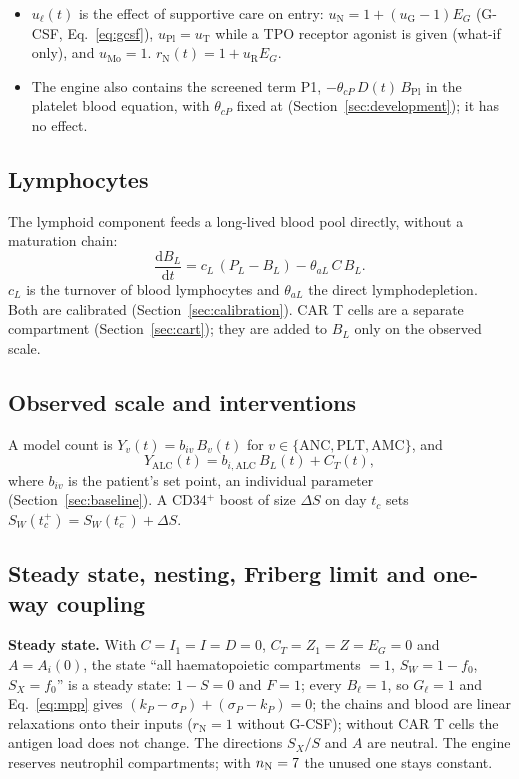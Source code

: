 \documentclass[11pt]{article}
\newcommand{\dd}{\mathrm{d}}
\begin{document}
\begin{itemize}
\item $u_\ell(t)$ is the effect of supportive care on entry: $u_{\mathrm{N}}=1+(u_{\mathrm{G}}-1)E_G$ (G-CSF, Eq.~\ref{eq:gcsf}), $u_{\mathrm{Pl}}=u_{\mathrm{T}}$ while a TPO receptor agonist is given (what-if only), and $u_{\mathrm{Mo}}=1$. $r_{\mathrm{N}}(t)=1+u_{\mathrm{R}}E_G$.
\item The engine also contains the screened term P1, $-\theta_{cP}\,D(t)\,B_{\mathrm{Pl}}$ in the platelet blood equation, with $\theta_{cP}$ fixed at \valThcp{} (Section~\ref{sec:development}); it has no effect.
\end{itemize}

\subsection{Lymphocytes}
The lymphoid component feeds a long-lived blood pool directly, without a maturation chain:
\begin{equation}
\frac{\dd B_L}{\dd t} = c_L\,(P_L-B_L) - \theta_{aL}\,C\,B_L. \label{eq:bl}
\end{equation}
$c_L$ is the turnover of blood lymphocytes and $\theta_{aL}$ the direct lymphodepletion. Both are calibrated (Section~\ref{sec:calibration}). CAR T cells are a separate compartment (Section~\ref{sec:cart}); they are added to $B_L$ only on the observed scale.

\subsection{Observed scale and interventions}
A model count is $Y_v(t)=b_{iv}\,B_v(t)$ for $v\in\{\mathrm{ANC},\mathrm{PLT},\mathrm{AMC}\}$, and
\begin{equation}
Y_{\mathrm{ALC}}(t)=b_{i,\mathrm{ALC}}\,B_L(t)+C_T(t), \label{eq:alc}
\end{equation}
where $b_{iv}$ is the patient's set point, an individual parameter (Section~\ref{sec:baseline}). A CD34$^+$ boost of size $\Delta S$ on day $t_c$ sets $S_W(t_c^+)=S_W(t_c^-)+\Delta S$.

\subsection{Steady state, nesting, Friberg limit and one-way coupling}\label{sec:steady}
\textbf{Steady state.} With $C=I_1=I=D=0$, $C_T=Z_1=Z=E_G=0$ and $A=A_i(0)$, the state ``all haematopoietic compartments $=1$, $S_W=1-f_0$, $S_X=f_0$'' is a steady state: $1-S=0$ and $F=1$; every $B_\ell=1$, so $G_\ell=1$ and Eq.~\ref{eq:mpp} gives $(k_P-\sigma_P)+(\sigma_P-k_P)=0$; the chains and blood are linear relaxations onto their inputs ($r_{\mathrm{N}}=1$ without G-CSF); without CAR T cells the antigen load does not change. The directions $S_X/S$ and $A$ are neutral. The engine reserves \valNTnSlots{} neutrophil compartments; with $n_{\mathrm{N}}=7$ the unused one stays constant.
\end{document}
